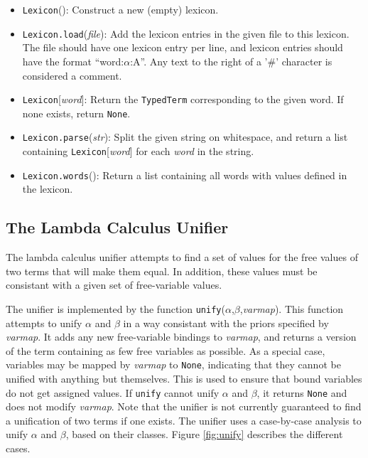 \documentclass[11pt]{article}
\begin{document}
\begin{itemize}
  \item \texttt{Lexicon}(): Construct a new (empty) lexicon.

  \item \texttt{Lexicon.load}(\textit{file}): Add the lexicon entries
  in the given file to this lexicon.  The file should have one lexicon
  entry per line, and lexicon entries should have the format
  ``word:$\alpha$:A''.  Any text to the right of a '\#' character is
  considered a comment.

  \item \texttt{Lexicon}[\textit{word}]: Return the \texttt{TypedTerm}
  corresponding to the given word.  If none exists, return
  \texttt{None}.

  \item \texttt{Lexicon.parse}(\textit{str}): Split the given string
  on whitespace, and return a list containing
  \texttt{Lexicon}[\textit{word}] for each \textit{word} in the
  string.

  \item \texttt{Lexicon.words}(): Return a list containing all words
  with values defined in the lexicon.
\end{itemize}

\subsection{The Lambda Calculus Unifier}
\label{sec:unify}

The lambda calculus unifier attempts to find a set of values for the
free values of two terms that will make them equal.  In addition,
these values must be consistant with a given set of free-variable
values.

The unifier is implemented by the function
\texttt{unify}($\alpha$,$\beta$,\textit{varmap}).  This function attempts to
unify $\alpha$ and $\beta$ in a way consistant with the priors specified by
\textit{varmap}.  It adds any new free-variable bindings to
\textit{varmap}, and returns a version of the term containing as few free
variables as possible.  As a special case, variables may be mapped by
\textit{varmap} to \texttt{None}, indicating that they cannot be
unified with anything but themselves.  This is used to ensure that
bound variables do not get assigned values.  If \texttt{unify} cannot
unify $\alpha$ and $\beta$, it returns \texttt{None} and does not modify
\textit{varmap}.  Note that the unifier is not currently guaranteed to
find a unification of two terms if one exists.  The unifier uses a
case-by-case analysis to unify $\alpha$ and $\beta$, based on their classes.
Figure \ref{fig:unify} describes the different cases.
\end{document}
